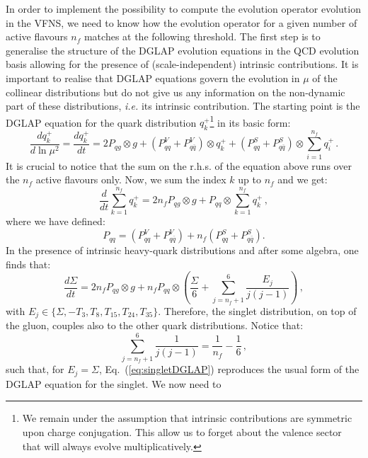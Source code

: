 \documentclass[10pt,a4paper]{article}
\begin{document}
In order to implement the possibility to compute the evolution
operator evolution in the VFNS, we need to know how the evolution
operator for a given number of active flavours $n_f$ matches at the
following threshold. The first step is to generalise the structure of
the DGLAP evolution equations in the QCD evolution basis allowing for
the presence of (scale-independent) intrinsic contributions. It is
important to realise that DGLAP equations govern the evolution in
$\mu$ of the collinear distributions but do not give us any
information on the non-dynamic part of these distributions,
\textit{i.e.} its intrinsic contribution. The starting point is the
DGLAP equation for the quark distribution $q_k^+$\footnote{We remain
  under the assumption that intrinsic contributions are symmetric upon
  charge conjugation. This allow us to forget about the valence sector
  that will always evolve multiplicatively.} in its basic form:
\begin{equation}
\frac{dq_k^+}{d\ln\mu^2} =\frac{dq_k^+}{dt}= 2P_{qg}\otimes g+
(P_{qq}^V+P_{q\overline{q}}^V)\otimes
q_k^++(P_{qq}^S+P_{q\overline{q}}^S)\otimes \sum_{i=1}^{n_f} q_i^+\,.
\end{equation}
It is crucial to notice that the sum on the r.h.s. of the equation
above runs over the $n_f$ active flavours only. Now, we sum the index
$k$ up to $n_f$ and we get:
\begin{equation}
\frac{d}{dt}\sum_{k=1}^{n_f} q_k^+= 2n_f P_{qg}\otimes g+
P_{qq}\otimes \sum_{k=1}^{n_f} q_k^+\,,
\end{equation}
where we have defined:
\begin{equation}
P_{qq} = (P_{qq}^V+P_{q\overline{q}}^V)+n_f(P_{qq}^S+P_{q\overline{q}}^S).
\end{equation}
In the presence of intrinsic heavy-quark distributions and after some
algebra, one finds that:
\begin{equation}\label{eq:singletDGLAP}
\frac{d\Sigma}{dt}= 2n_f P_{qg}\otimes g+n_fP_{qq}\otimes \left(\frac{\Sigma}{6}+\sum_{j=n_f+1}^6\frac{E_j}{j(j-1)}\right)\,,
\end{equation}
with $E_j\in \{\Sigma,-T_3,T_8,T_{15},T_{24},T_{35}\}$. Therefore, the
singlet distribution, on top of the gluon, couples also to the other
quark distributions. Notice that:
\begin{equation}
\sum_{j=n_f+1}^6\frac{1}{j(j-1)} = \frac{1}{n_f}-\frac16\,,
\end{equation}
such that, for $E_j = \Sigma$, Eq.~(\ref{eq:singletDGLAP}) reproduces
the usual form of the DGLAP equation for the singlet. We now need to
\end{document}

